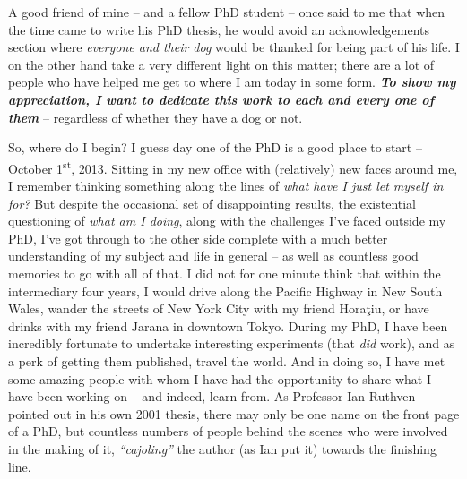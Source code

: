 
\begin{preamble}
{}


A good friend of mine -- and a fellow PhD student -- once said to me that when the time came to write his PhD thesis, he would avoid an acknowledgements section where \emph{everyone and their dog} would be thanked for being part of his life. I on the other hand take a very different light on this matter; there are a lot of people who have helped me get to where I am today in some form. \textbf{\emph{To show my appreciation, I want to dedicate this work to each and every one of them}} -- regardless of whether they have a dog or not.

So, where do I begin? I guess day one of the PhD is a good place to start -- October 1\textsuperscript{st}, 2013. Sitting in my new office with (relatively) new faces around me, I remember thinking something along the lines of \emph{what have I just let myself in for?} But despite the occasional set of disappointing results, the existential questioning of \emph{what am I doing}, along with the challenges I've faced outside my PhD, I've got through to the other side complete with a much better understanding of my subject and life in general -- as well as countless good memories to go with all of that. I did not for one minute think that within the intermediary four years, I would drive along the Pacific Highway in New South Wales, wander the streets of New York City with my friend Hora\c{t}iu, or have drinks with my friend Jarana in downtown Tokyo. During my PhD, I have been incredibly fortunate to undertake interesting experiments (that \emph{did} work), and as a perk of getting them published, travel the world. And in doing so, I have met some amazing people with whom I have had the opportunity to share what I have been working on -- and indeed, learn from. As Professor Ian Ruthven pointed out in his own 2001 thesis, there may only be one name on the front page of a PhD, but countless numbers of people behind the scenes who were involved in the making of it, \emph{``cajoling''} the author (as Ian put it) towards the finishing line.


\end{preamble}
